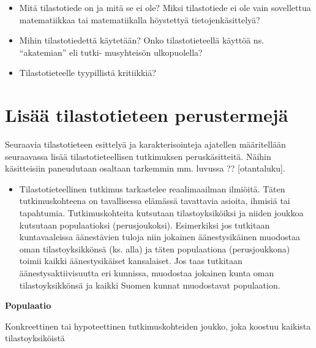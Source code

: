 \documentclass[
]{book}
\providecommand{\tightlist}{%
  \setlength{\itemsep}{0pt}\setlength{\parskip}{0pt}}
\begin{document}
\begin{itemize}
\tightlist
\item
  Mitä tilastotiede on ja mitä se ei ole? Miksi tilastotiede ei ole vain sovellettua matematiikkaa
  tai matematiikalla höystettyä tietojenkäsittelyä?
\item
  Mihin tilastotiedettä käytetään? Onko tilastotieteellä käyttöä ns. ``akatemian'' eli tutki-
  musyhteisön ulkopuolella?
\item
  Tilastotieteelle tyypillistä kritiikkiä?
\end{itemize}

\hypertarget{lisuxe4uxe4-tilastotieteen-perustermejuxe4}{%
\section{Lisää tilastotieteen perustermejä}\label{lisuxe4uxe4-tilastotieteen-perustermejuxe4}}

Seuraavia tilastotieteen esittelyä ja karakterisointeja ajatellen määritellään seuraavassa lisää tilastotieteellisen tutkimuksen peruskäsitteitä. Näihin käsitteisiin paneudutaan osaltaan tarkemmin mm. luvussa ?? {[}otantaluku{]}.

\begin{itemize}
\tightlist
\item
  Tilastotieteellinen tutkimus tarkastelee reaalimaailman ilmiöitä. Täten tutkimuskohteena on tavallisessa elämässä tavattavia asioita, ihmisiä tai tapahtumia. Tutkimuskohteita kutsutaan tilastoyksiköiksi ja niiden joukkoa kutsutaan populaatioksi (perusjoukoksi). Esimerkiksi jos tutkitaan kuntavaaleissa äänestävien tuloja niin jokainen äänestysikäinen muodostaa oman tilastoyksikkönsä (ks. alla) ja täten populaationa (perusjoukkona) toimii kaikki
  äänestysikäiset kansalaiset. Jos taas tutkitaan äänestysaktiivisuutta eri kunnissa, muodostaa jokainen kunta oman tilastoyksikkönsä ja kaikki Suomen kunnat muodostavat populaation.
\end{itemize}

\begin{noteblock}{}
\textbf{Populaatio}

Konkreettinen tai hypoteettinen tutkimuskohteiden joukko, joka
koostuu kaikista tilastoyksiköistä

\end{noteblock}
\end{document}
